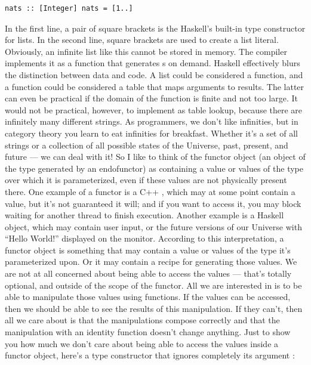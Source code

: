 \begin{Verbatim}[commandchars=\\\{\}]
nats :: [Integer] nats = [1..]
\end{Verbatim}
In the first line, a pair of square brackets is the Haskell's built-in
type constructor for lists. In the second line, square brackets are used
to create a list literal. Obviously, an infinite list like this cannot
be stored in memory. The compiler implements it as a function that
generates s on demand. Haskell effectively blurs the
distinction between data and code. A list could be considered a
function, and a function could be considered a table that maps arguments
to results. The latter can even be practical if the domain of the
function is finite and not too large. It would not be practical,
however, to implement  as table lookup, because there are
infinitely many different strings. As programmers, we don't like
infinities, but in category theory you learn to eat infinities for
breakfast. Whether it's a set of all strings or a collection of all
possible states of the Universe, past, present, and future --- we can
deal with it! So I like to think of the functor object (an object of the
type generated by an endofunctor) as containing a value or values of the
type over which it is parameterized, even if these values are not
physically present there. One example of a functor is a C++
, which may at some point contain a value, but it's
not guaranteed it will; and if you want to access it, you may block
waiting for another thread to finish execution. Another example is a
Haskell  object, which may contain user input, or the future
versions of our Universe with ``Hello World!'' displayed on the monitor.
According to this interpretation, a functor object is something that may
contain a value or values of the type it's parameterized upon. Or it may
contain a recipe for generating those values. We are not at all
concerned about being able to access the values --- that's totally
optional, and outside of the scope of the functor. All we are interested
in is to be able to manipulate those values using functions. If the
values can be accessed, then we should be able to see the results of
this manipulation. If they can't, then all we care about is that the
manipulations compose correctly and that the manipulation with an
identity function doesn't change anything. Just to show you how much we
don't care about being able to access the values inside a functor
object, here's a type constructor that ignores completely its argument
:

